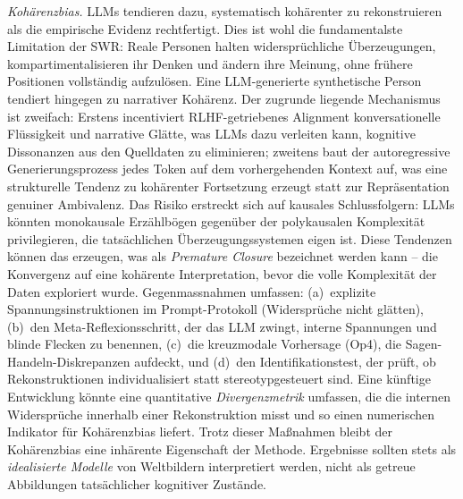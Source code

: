 \documentclass[11pt,a4paper]{article}
\theoremstyle{definition}
\theoremstyle{plain}
\theoremstyle{remark}
\begin{document}
\emph{Koh\"arenzbias.} LLMs tendieren dazu, systematisch koh\"arenter zu rekonstruieren als die empirische Evidenz rechtfertigt. Dies ist wohl die fundamentalste Limitation der SWR: Reale Personen halten widerspr\"uchliche \"Uberzeugungen, kompartimentalisieren ihr Denken und \"andern ihre Meinung, ohne fr\"uhere Positionen vollst\"andig aufzul\"osen. Eine LLM-generierte synthetische Person tendiert hingegen zu narrativer Koh\"arenz. Der zugrunde liegende Mechanismus ist zweifach: Erstens incentiviert RLHF-getriebenes Alignment konversationelle Fl\"ussigkeit und narrative Gl\"atte, was LLMs dazu verleiten kann, kognitive Dissonanzen aus den Quelldaten zu eliminieren; zweitens baut der autoregressive Generierungsprozess jedes Token auf dem vorhergehenden Kontext auf, was eine strukturelle Tendenz zu koh\"arenter Fortsetzung erzeugt statt zur Repr\"asentation genuiner Ambivalenz. Das Risiko erstreckt sich auf kausales Schlussfolgern: LLMs k\"onnten monokausale Erz\"ahlb\"ogen gegen\"uber der polykausalen Komplexit\"at privilegieren, die tats\"achlichen \"Uberzeugungssystemen eigen ist. Diese Tendenzen k\"onnen das erzeugen, was als \emph{Premature Closure} bezeichnet werden kann -- die Konvergenz auf eine koh\"arente Interpretation, bevor die volle Komplexit\"at der Daten exploriert wurde. Gegenmassnahmen umfassen: (a)~explizite Spannungsinstruktionen im Prompt-Protokoll (\glqq Widerspr\"uche nicht gl\"atten\grqq), (b)~den Meta-Reflexionsschritt, der das LLM zwingt, interne Spannungen und blinde Flecken zu benennen, (c)~die kreuzmodale Vorhersage (Op4), die Sagen-Handeln-Diskrepanzen aufdeckt, und (d)~den Identifikationstest, der pr\"uft, ob Rekonstruktionen individualisiert statt stereotypgesteuert sind. Eine k\"unftige Entwicklung k\"onnte eine quantitative \emph{Divergenzmetrik} umfassen, die die internen Widerspr\"uche innerhalb einer Rekonstruktion misst und so einen numerischen Indikator f\"ur Koh\"arenzbias liefert. Trotz dieser Ma\ss{}nahmen bleibt der Koh\"arenzbias eine inh\"arente Eigenschaft der Methode. Ergebnisse sollten stets als \emph{idealisierte Modelle} von Weltbildern interpretiert werden, nicht als getreue Abbildungen tats\"achlicher kognitiver Zust\"ande.
\end{document}
